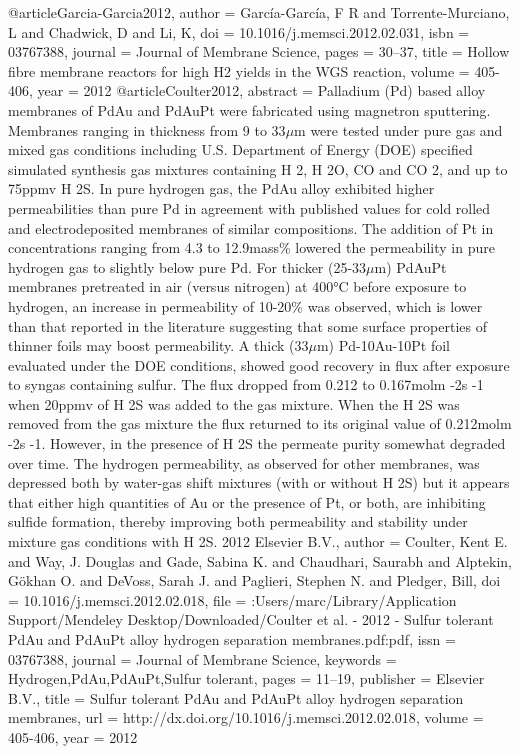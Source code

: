 @article{Garcia-Garcia2012,
author = {Garc{\'{i}}a-Garc{\'{i}}a, F R and Torrente-Murciano, L and Chadwick, D and Li, K},
doi = {10.1016/j.memsci.2012.02.031},
isbn = {03767388},
journal = {Journal of Membrane Science},
pages = {30--37},
title = {{Hollow fibre membrane reactors for high H2 yields in the WGS reaction}},
volume = {405-406},
year = {2012}
}
@article{Coulter2012,
abstract = {Palladium (Pd) based alloy membranes of PdAu and PdAuPt were fabricated using magnetron sputtering. Membranes ranging in thickness from 9 to 33$\mu$m were tested under pure gas and mixed gas conditions including U.S. Department of Energy (DOE) specified simulated synthesis gas mixtures containing H 2, H 2O, CO and CO 2, and up to 75ppmv H 2S. In pure hydrogen gas, the PdAu alloy exhibited higher permeabilities than pure Pd in agreement with published values for cold rolled and electrodeposited membranes of similar compositions. The addition of Pt in concentrations ranging from 4.3 to 12.9mass{\%} lowered the permeability in pure hydrogen gas to slightly below pure Pd. For thicker (25-33$\mu$m) PdAuPt membranes pretreated in air (versus nitrogen) at 400°C before exposure to hydrogen, an increase in permeability of 10-20{\%} was observed, which is lower than that reported in the literature suggesting that some surface properties of thinner foils may boost permeability. A thick (33$\mu$m) Pd-10Au-10Pt foil evaluated under the DOE conditions, showed good recovery in flux after exposure to syngas containing sulfur. The flux dropped from 0.212 to 0.167molm -2s -1 when 20ppmv of H 2S was added to the gas mixture. When the H 2S was removed from the gas mixture the flux returned to its original value of 0.212molm -2s -1. However, in the presence of H 2S the permeate purity somewhat degraded over time. The hydrogen permeability, as observed for other membranes, was depressed both by water-gas shift mixtures (with or without H 2S) but it appears that either high quantities of Au or the presence of Pt, or both, are inhibiting sulfide formation, thereby improving both permeability and stability under mixture gas conditions with H 2S. {\textcopyright} 2012 Elsevier B.V.},
author = {Coulter, Kent E. and Way, J. Douglas and Gade, Sabina K. and Chaudhari, Saurabh and Alptekin, G{\"{o}}khan O. and DeVoss, Sarah J. and Paglieri, Stephen N. and Pledger, Bill},
doi = {10.1016/j.memsci.2012.02.018},
file = {:Users/marc/Library/Application Support/Mendeley Desktop/Downloaded/Coulter et al. - 2012 - Sulfur tolerant PdAu and PdAuPt alloy hydrogen separation membranes.pdf:pdf},
issn = {03767388},
journal = {Journal of Membrane Science},
keywords = {Hydrogen,PdAu,PdAuPt,Sulfur tolerant},
pages = {11--19},
publisher = {Elsevier B.V.},
title = {{Sulfur tolerant PdAu and PdAuPt alloy hydrogen separation membranes}},
url = {http://dx.doi.org/10.1016/j.memsci.2012.02.018},
volume = {405-406},
year = {2012}
}
